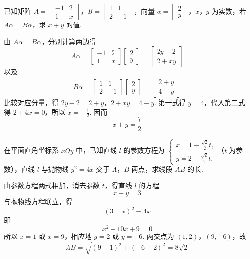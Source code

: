 \reuseproblemnumber
\begin{problem}[B]
已知矩阵 \(A=\begin{bmatrix}-1&2\\1&x\end{bmatrix}\)，\(B=\begin{bmatrix}1&1\\2&-1\end{bmatrix}\)，向量 \(\alpha=\begin{bmatrix}2\\y\end{bmatrix}\)，\(x\)，\(y\) 为实数，若 \( A\alpha=B\alpha \)，求 \( x+y \) 的值.
\end{problem}

\begin{solution}
由 \(A\alpha=B\alpha\)，分别计算两边得
\[
A\alpha=\begin{bmatrix}-1&2\\1&x\end{bmatrix}\begin{bmatrix}2\\y\end{bmatrix}=\begin{bmatrix}2y-2\\2+xy\end{bmatrix}
\]
以及
\[
B\alpha=\begin{bmatrix}1&1\\2&-1\end{bmatrix}\begin{bmatrix}2\\y\end{bmatrix}=\begin{bmatrix}2+y\\4-y\end{bmatrix}
\]
比较对应分量，得 \(2y-2=2+y\)，\(2+xy=4-y\).
第一式得 \(y=4\)，代入第二式得 \(2+4x=0\)，所以 \(x=-\frac12\). 因而
\[
x+y=\frac72
\]
\end{solution}

\reuseproblemnumber
\begin{problem}[C]
在平面直角坐标系 \(xOy\) 中，已知直线 \(l\) 的参数方程为 \(\begin{cases}
x = 1 - \frac{\sqrt{2}}{2} t,\\
y = 2 + \frac{\sqrt{2}}{2} t,
\end{cases}\)（\(t\) 为参数），直线 \(l\) 与抛物线 \(y^2 = 4x\) 交于 \(A\)，\(B\) 两点，求线段 \(AB\) 的长.
\end{problem}

\begin{solution}
由参数方程两式相加，消去参数 \(t\)，得直线 \(l\) 的方程
\[
x+y=3
\]
与抛物线方程联立，得
\[
(3-x)^2=4x
\]
即
\[
x^2-10x+9=0
\]
所以 \(x=1\) 或 \(x=9\)，相应地 \(y=2\) 或 \(y=-6\). 两交点为 \((1,2)\)，\((9,-6)\)，故
\[
AB=\sqrt{(9-1)^2+(-6-2)^2}=8\sqrt2
\]
\end{solution}

